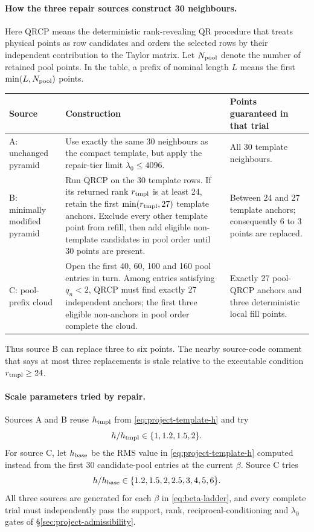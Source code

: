 \documentclass[11pt,a4paper]{article}
\begin{document}
\paragraph{How the three repair sources construct 30 neighbours.}
Here QRCP means the deterministic rank-revealing QR procedure that treats physical points
as row candidates and orders the selected rows by their independent contribution to the
Taylor matrix. Let $N_{\rm pool}$ denote the number of retained pool points. In the
table, a prefix of nominal length $L$ means the first $\min(L,N_{\rm pool})$ points.
\begin{center}\small
\begin{tabularx}{\textwidth}{@{}P{2.2cm}P{5.5cm}X@{}}
\toprule
\textbf{Source} & \textbf{Construction} & \textbf{Points guaranteed in that trial} \\
\midrule
A: unchanged pyramid &
Use exactly the same 30 neighbours as the compact template, but apply the repair-tier
limit $\lambda_0\le4096$. &
All 30 template neighbours. \\
B: minimally modified pyramid &
Run QRCP on the 30 template rows. If its returned rank
$r_{\rm tmpl}$ is at least 24, retain the first
$\min(r_{\rm tmpl},27)$ template anchors. Exclude every other template point from refill,
then add eligible non-template candidates in pool order until 30 points are present. &
Between 24 and 27 template anchors; consequently 6 to 3 points are replaced. \\
C: pool-prefix cloud &
Open the first 40, 60, 100 and 160 pool entries in turn. Among entries satisfying
$q_n<2$, QRCP must find exactly 27 independent anchors; the first three eligible
non-anchors in pool order complete the cloud. &
Exactly 27 pool-QRCP anchors and three deterministic local fill points. \\
\bottomrule
\end{tabularx}
\end{center}
Thus source B can replace three to six points. The nearby source-code comment that says
at most three replacements is stale relative to the executable condition
$r_{\rm tmpl}\ge24$.

\paragraph{Scale parameters tried by repair.}
Sources A and B reuse $h_{\rm tmpl}$ from \eqref{eq:project-template-h} and try
\[
 h/h_{\rm tmpl}\in\{1,1.2,1.5,2\}.
\]
For source C, let $h_{\rm base}$ be the RMS value in
\eqref{eq:project-template-h} computed instead from the first 30 candidate-pool entries
at the current $\beta$. Source C tries
\[
 h/h_{\rm base}\in\{1.2,1.5,2,2.5,3,4,5,6\}.
\]
All three sources are generated for each $\beta$ in \eqref{eq:beta-ladder}, and every
complete trial must independently pass the support, rank, reciprocal-conditioning and
$\lambda_0$ gates of \S\ref{sec:project-admissibility}.
\end{document}
